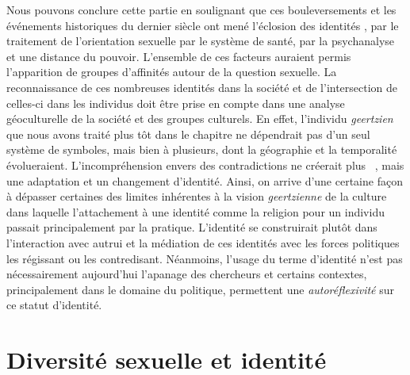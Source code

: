 Nous pouvons conclure cette partie en soulignant que ces bouleversements et les événements historiques du dernier siècle ont mené l'éclosion des identités \lgbt{}, par le traitement de l'orientation sexuelle par le système de santé, par la psychanalyse et une distance du pouvoir.
L'ensemble de ces facteurs auraient permis l'apparition de groupes d'affinités autour de la question sexuelle.
La reconnaissance de ces nombreuses identités dans la société et de l'intersection de celles-ci dans les individus doit être prise en compte dans une analyse géoculturelle de la société et des groupes culturels.
En effet, l'individu \emph{geertzien} que nous avons traité plus tôt dans le chapitre ne dépendrait pas d'un seul système de symboles, mais bien à plusieurs, dont la géographie et la temporalité évolueraient.
L'incompréhension envers des contradictions ne créerait plus ~\citep[33]{Geertz1972}, mais une adaptation et un changement d'identité.
Ainsi, on arrive d'une certaine façon à dépasser certaines des limites inhérentes à la vision \emph{geertzienne} de la culture dans laquelle l'attachement à une identité comme la religion pour un individu passait principalement par la pratique.
L'identité se construirait plutôt dans l'interaction avec autrui et la médiation de ces identités avec les forces politiques les régissant ou les contredisant.
Néanmoins, l'usage du terme d'identité n'est pas nécessairement aujourd'hui l'apanage des chercheurs et certains contextes, principalement dans le domaine du politique, permettent une \emph{autoréflexivité} sur ce statut d'identité.

\section{Diversité sexuelle et identité}
\label{sec:diversit_sexuelle_et_identit_}

